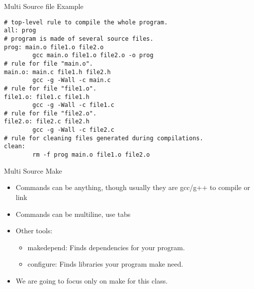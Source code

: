 \documentclass{beamer}
\begin{document}
\begin{frame}[fragile]{Multi Source file Example}
\begin{lstlisting}
# top-level rule to compile the whole program. 
all: prog 
# program is made of several source files. 
prog: main.o file1.o file2.o 
        gcc main.o file1.o file2.o -o prog 
# rule for file "main.o". 
main.o: main.c file1.h file2.h 
        gcc -g -Wall -c main.c 
# rule for file "file1.o". 
file1.o: file1.c file1.h 
        gcc -g -Wall -c file1.c 
# rule for file "file2.o". 
file2.o: file2.c file2.h 
        gcc -g -Wall -c file2.c 
# rule for cleaning files generated during compilations. 
clean: 
        rm -f prog main.o file1.o file2.o
\end{lstlisting}
\end{frame}

\begin{frame}{Multi Source Make}
\begin{itemize}
\item Commands can be anything, though usually they are gcc/g++ to compile or link
\item Commands can be multiline, use tabs
\item Other tools:
\begin{itemize}
\item makedepend: Finds dependencies for your program.
\item configure: Finds libraries your program make need.
\end{itemize}
\item We are going to focus only on make for this class.
\end{itemize}
\end{frame}
\end{document}
